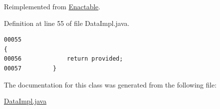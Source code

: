 Reimplemented from \hyperlink{interfaceEnactable_a0}{Enactable}.

Definition at line 55 of file Data\-Impl.java.\footnotesize\begin{verbatim}00055                                                                                    {
00056             return provided;
00057         }
\end{verbatim}\normalsize 


The documentation for this class was generated from the following file:\begin{CompactItemize}
\item 
\hyperlink{DataImpl_8java-source}{Data\-Impl.java}\end{CompactItemize}
